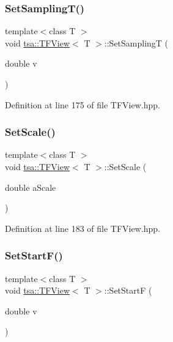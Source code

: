 \subsubsection{\texorpdfstring{Set\+Sampling\+T()}{SetSamplingT()}}
{\footnotesize\ttfamily template$<$class T $>$ \\
void \hyperlink{classtsa_1_1_t_f_view}{tsa\+::\+T\+F\+View}$<$ T $>$\+::Set\+SamplingT (\begin{DoxyParamCaption}\item[{double}]{v }\end{DoxyParamCaption})\hspace{0.3cm}{\ttfamily [inline]}}



Definition at line 175 of file T\+F\+View.\+hpp.

\mbox{\label{classtsa_1_1_t_f_view_a4926dbef93856a5b642c83ad6c60a178}} 
\subsubsection{\texorpdfstring{Set\+Scale()}{SetScale()}}
{\footnotesize\ttfamily template$<$class T $>$ \\
void \hyperlink{classtsa_1_1_t_f_view}{tsa\+::\+T\+F\+View}$<$ T $>$\+::Set\+Scale (\begin{DoxyParamCaption}\item[{double}]{a\+Scale }\end{DoxyParamCaption})\hspace{0.3cm}{\ttfamily [inline]}}



Definition at line 183 of file T\+F\+View.\+hpp.

\mbox{\label{classtsa_1_1_t_f_view_a8a3ef3daaaab4d9836f32140079c747f}} 
\subsubsection{\texorpdfstring{Set\+Start\+F()}{SetStartF()}}
{\footnotesize\ttfamily template$<$class T $>$ \\
void \hyperlink{classtsa_1_1_t_f_view}{tsa\+::\+T\+F\+View}$<$ T $>$\+::Set\+StartF (\begin{DoxyParamCaption}\item[{double}]{v }\end{DoxyParamCaption})\hspace{0.3cm}{\ttfamily [inline]}}




